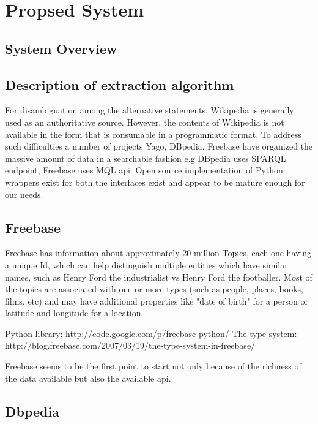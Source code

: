 \documentclass[11pt]{article}
\begin{document}
\section {Propsed System}

\subsection{System Overview}



\subsection{Description of extraction algorithm}

For disambiguation among the alternative statements, Wikipedia is generally used
as an authoritative source. However, the contents of Wikipedia is not available
in the form that is consumable in a programmatic format. To address such
difficulties a number of projects Yago, DBpedia, Freebase have organized the
massive amount of data in a searchable fashion e.g DBpedia uses SPARQL endpoint,
Freebase uses MQL api. Open source implementation of Python wrappers exist for
both the interfaces exist and appear to be mature enough for our needs.

\subsection{Freebase} 
Freebase has information about approximately 20 million Topics,
each one having a unique Id, which can help distinguish multiple entities which
have similar names, such as Henry Ford the industrialist vs Henry Ford the
footballer. Most of the topics are associated with one or more types (such as
people, places, books, films, etc) and may have additional properties like "date
of birth" for a person or latitude and longitude for a location.


Python library: http://code.google.com/p/freebase-python/ The type system:
http://blog.freebase.com/2007/03/19/the-type-system-in-freebase/

Freebase seems to be the first point to start not only because of
the richness of the data available but also the available api. 




\subsection{Dbpedia}
\end{document}

